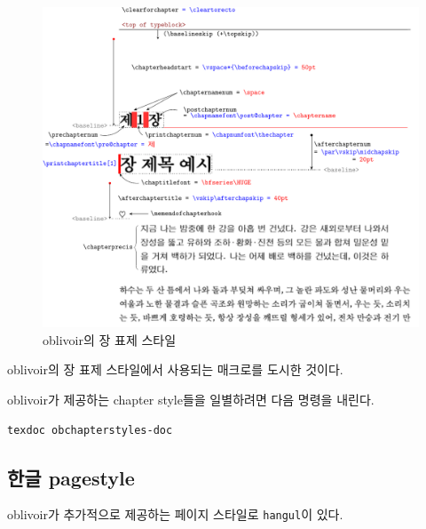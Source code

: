 \documentclass[
	12pt,
	a4paper,
	kosection,
	footnote,
	nobookmarks,
	microtype,
	figtabcapt,
]{oblivoir}
\begin{document}
\begin{figure}
\centering
\includegraphics[width=\textwidth]{chapstyfig}
\caption{oblivoir의 장 표제 스타일}\label{fig:chapsty}
\end{figure}

\는 \textsf{oblivoir}의 장 표제 스타일에서 사용되는
매크로를 도시한 것이다.


\medskip

\textsf{oblivoir}가 제공하는 chapter style들을 일별하려면
다음 명령을 내린다.
\begin{verbatim}
texdoc obchapterstyles-doc
\end{verbatim}

\subsection{한글 pagestyle}

oblivoir가 추가적으로 제공하는 페이지 스타일로 \texttt{hangul}이 있다.
\begin{boxedverbatim}
\pagestyle{hangul}
\end{boxedverbatim}
\end{document}
